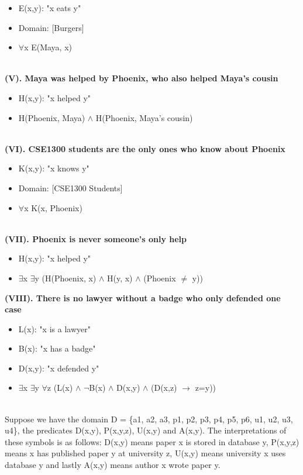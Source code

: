 \documentclass[a4paper]{article}
\begin{document}
\begin{itemize}
    \item E(x,y): "x eats y"
    \item Domain: [Burgers]
    \item $\forall $x E(Maya, x)
\end{itemize}
\ \\
\textbf{(V). Maya was helped by Phoenix, who also helped Maya's cousin}
\begin{itemize}
    \item H(x,y): "x helped y"
    \item H(Phoenix, Maya) $\wedge $ H(Phoenix, Maya's cousin)
\end{itemize}
\ \\
\textbf{(VI). CSE1300 students are the only ones who know about Phoenix}
\begin{itemize}
    \item K(x,y): "x knows y"
    \item Domain: [CSE1300 Students]
    \item $\forall $x K(x, Phoenix)
\end{itemize}
\ \\
\textbf{(VII). Phoenix is never someone's only help}
\begin{itemize}
    \item H(x,y): "x helped y"
    \item $\exists $x $\exists $y (H(Phoenix, x) $\wedge $ H(y, x) $\wedge $ (Phoenix $\neq $ y))
\end{itemize}
\newpage
\textbf{(VIII). There is no lawyer without a badge who only defended one case}
\begin{itemize}
    \item L(x): "x is a lawyer"
    \item B(x): "x has a badge"
    \item D(x,y): "x defended y"
    \item $\exists $x $\exists $y $\forall $z (L(x) $\wedge $ $\neg $B(x) $\wedge $ D(x,y) $\wedge $ (D(x,z) $\rightarrow $ z=y))
\end{itemize}
\ \\
Suppose we have the domain D = \{a1, a2, a3, p1, p2, p3, p4, p5, p6, u1, u2, u3, u4\}, the predicates
D(x,y), P(x,y,z), U(x,y) and A(x,y). The interpretations of these symbols is as follows: D(x,y)
means paper x is stored in database y, P(x,y,z) means x has published paper y at university z,
U(x,y) means university x uses database y and lastly A(x,y) means author x wrote paper y.
\end{document}
